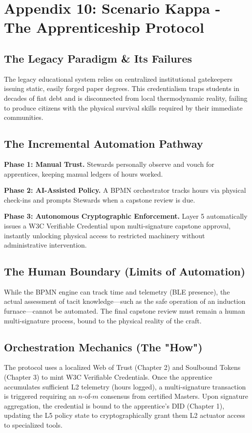 \chapter{Appendix 10: Scenario Kappa - The Apprenticeship Protocol}

\section{The Legacy Paradigm \& Its Failures}
The legacy educational system relies on centralized institutional gatekeepers issuing static, easily forged paper degrees. This credentialism traps students in decades of fiat debt and is disconnected from local thermodynamic reality, failing to produce citizens with the physical survival skills required by their immediate communities.

\section{The Incremental Automation Pathway}
\textbf{Phase 1: Manual Trust.} Stewards personally observe and vouch for apprentices, keeping manual ledgers of hours worked.

\textbf{Phase 2: AI-Assisted Policy.} A BPMN orchestrator tracks hours via physical check-ins and prompts Stewards when a capstone review is due.

\textbf{Phase 3: Autonomous Cryptographic Enforcement.} Layer 5 automatically issues a W3C Verifiable Credential upon multi-signature capstone approval, instantly unlocking physical access to restricted machinery without administrative intervention.

\section{The Human Boundary (Limits of Automation)}
While the BPMN engine can track time and telemetry (BLE presence), the actual assessment of tacit knowledge---such as the safe operation of an induction furnace---cannot be automated. The final capstone review must remain a human multi-signature process, bound to the physical reality of the craft.

\section{Orchestration Mechanics (The "How")}
The protocol uses a localized Web of Trust (Chapter 2) and Soulbound Tokens (Chapter 3) to mint W3C Verifiable Credentials. Once the apprentice accumulates sufficient L2 telemetry (hours logged), a multi-signature transaction is triggered requiring an $n$-of-$m$ consensus from certified Masters. Upon signature aggregation, the credential is bound to the apprentice's DID (Chapter 1), updating the L5 policy state to cryptographically grant them L2 actuator access to specialized tools.
